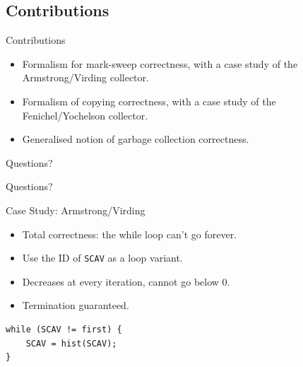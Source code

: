 \documentclass[usenames,dvipsnames]{beamer}
\begin{document}
\subsection{Contributions}

\begin{frame}{Contributions}
  \begin{itemize}
  \item Formalism for mark-sweep correctness, with a case study of the
    Armstrong/Virding collector.
  \item Formalism of copying correctness, with a case study of the
    Fenichel/Yochelson collector.
  \item Generalised notion of garbage collection correctness.
  \end{itemize}

\end{frame}


\begin{frame}{Questions?}
  \begin{center}
    \huge Questions?
  \end{center}

  
  \nocite{Myreen10,McCreight07}
  \footnotesize
  

\end{frame}


\begin{frame}[fragile]{Case Study: Armstrong/Virding}
  \begin{itemize}
  \item Total correctness: the while loop can't go forever.
  \item Use the ID of \texttt{SCAV} as a loop variant.
  \item Decreases at every iteration, cannot go below 0.
  \item Termination guaranteed.
  \end{itemize}

  \begin{lstlisting}
while (SCAV != first) {
    SCAV = hist(SCAV);
}
  \end{lstlisting}

\end{frame}
\end{document}
